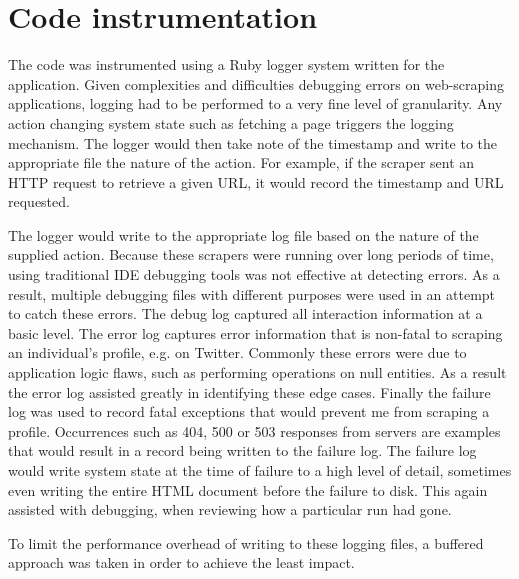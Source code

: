 


\section{Code instrumentation}

The code was instrumented using a Ruby logger system written for the application. Given complexities and difficulties debugging errors on web-scraping applications, logging had to be performed to a very fine level of granularity. Any action changing system state such as fetching a page triggers the logging mechanism. The logger would then take note of the timestamp and write to the appropriate file the nature of the action. For example, if the scraper sent an HTTP request to retrieve a given URL, it would record the timestamp and URL requested. 

The logger would write to the appropriate log file based on the nature of the supplied action. Because these scrapers were running over long periods of time, using traditional IDE debugging tools was not effective at detecting errors. As a result, multiple debugging files with different purposes were used in an attempt to catch these errors. The debug log captured all interaction information at a basic level. The error log captures error information that is non-fatal to scraping an individual's profile, e.g. on Twitter. Commonly these errors were due to application logic flaws, such as performing operations on null entities. As a result the error log assisted greatly in identifying these edge cases. Finally the failure log was used to record fatal exceptions that would prevent me from scraping a profile. Occurrences such as 404, 500 or 503 responses from servers are examples that would result in a record being written to the failure log. The failure log would write system state at the time of failure to a 
high level of detail, sometimes even writing the entire HTML document before the failure to disk. This again assisted with debugging, when reviewing how a particular run had gone. 

To limit the performance overhead of writing to these logging files, a buffered approach was taken in order to achieve the least impact. 



